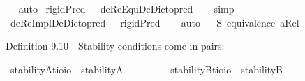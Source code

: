 \begin{isabellebody}
\ %
%
\isamarkupfalse%
\ auto%
%
%
\isanewline
{}\isamarkupfalse%
\ {\isachardoublequoteopen}{\isasymlfloor}rigidPred\ {\isacharparenleft}{\isasymtau}{\isacharcolon}{\isacharcolon}{\isasymup}{\isasymlangle}{\isasymzero}{\isasymrangle}{\isacharparenright}\ \isactrlbold {\isasymrightarrow}\ deReEquDeDicto{\isacharunderscore}pred\ {\isasymtau}{\isasymrfloor}{\isachardoublequoteclose}%
\ %
%
\isamarkupfalse%
\ simp%
%
%
\isanewline
{}\isamarkupfalse%
\ {\isachardoublequoteopen}{\isasymlfloor}deReImplDeDicto{\isacharunderscore}pred\ {\isacharparenleft}{\isasymtau}{\isacharcolon}{\isacharcolon}{\isasymup}{\isasymlangle}{\isasymzero}{\isasymrangle}{\isacharparenright}\ \isactrlbold {\isasymrightarrow}\ rigidPred\ {\isasymtau}{\isasymrfloor}{\isachardoublequoteclose}%
\ %
%
\isamarkupfalse%
\ auto%
%
%
%
\isamarkuptrue%
\isamarkupfalse%
\ \isanewline
\ S{}{\isacharcolon}\ {\isachardoublequoteopen}equivalence\ aRel{\isachardoublequoteclose}\ %
%
\begin{isamarkuptext}%
Definition 9.10 - Stability conditions come in pairs:%
\end{isamarkuptext}\isamarkuptrue%
\isamarkupfalse%
\ stabilityA{\isacharcolon}{\isacharcolon}{\isachardoublequoteopen}{\isacharparenleft}{\isacharprime}t{\isasymRightarrow}io{\isacharparenright}{\isasymRightarrow}io{\isachardoublequoteclose}\ \ {\isachardoublequoteopen}stabilityA\ {\isasymtau}\ {\isasymequiv}\ \isactrlbold {\isasymforall}{\isasymalpha}{\isachardot}\ {\isacharparenleft}{\isasymtau}\ {\isasymalpha}{\isacharparenright}\ \isactrlbold {\isasymrightarrow}\ \isactrlbold {\isasymbox}{\isacharparenleft}{\isasymtau}\ {\isasymalpha}{\isacharparenright}{\isachardoublequoteclose}\isanewline
{}\isamarkupfalse%
\ stabilityB{\isacharcolon}{\isacharcolon}{\isachardoublequoteopen}{\isacharparenleft}{\isacharprime}t{\isasymRightarrow}io{\isacharparenright}{\isasymRightarrow}io{\isachardoublequoteclose}\ \ {\isachardoublequoteopen}stabilityB\ {\isasymtau}\ {\isasymequiv}\ \isactrlbold {\isasymforall}{\isasymalpha}{\isachardot}\ \isactrlbold {\isasymdiamond}{\isacharparenleft}{\isasymtau}\ {\isasymalpha}{\isacharparenright}\ \isactrlbold {\isasymrightarrow}\ {\isacharparenleft}{\isasymtau}\ {\isasymalpha}{\isacharparenright}{\isachardoublequoteclose}%

\end{isabellebody}
